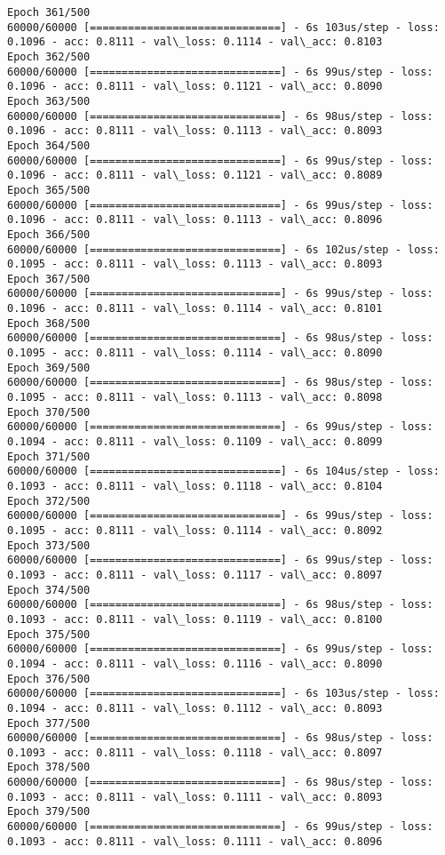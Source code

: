 \documentclass[11pt]{article}
\begin{document}
\begin{Verbatim}[commandchars=\\\{\}]
Epoch 361/500
60000/60000 [==============================] - 6s 103us/step - loss: 0.1096 - acc: 0.8111 - val\_loss: 0.1114 - val\_acc: 0.8103
Epoch 362/500
60000/60000 [==============================] - 6s 99us/step - loss: 0.1096 - acc: 0.8111 - val\_loss: 0.1121 - val\_acc: 0.8090
Epoch 363/500
60000/60000 [==============================] - 6s 98us/step - loss: 0.1096 - acc: 0.8111 - val\_loss: 0.1113 - val\_acc: 0.8093
Epoch 364/500
60000/60000 [==============================] - 6s 99us/step - loss: 0.1096 - acc: 0.8111 - val\_loss: 0.1121 - val\_acc: 0.8089
Epoch 365/500
60000/60000 [==============================] - 6s 99us/step - loss: 0.1096 - acc: 0.8111 - val\_loss: 0.1113 - val\_acc: 0.8096
Epoch 366/500
60000/60000 [==============================] - 6s 102us/step - loss: 0.1095 - acc: 0.8111 - val\_loss: 0.1113 - val\_acc: 0.8093
Epoch 367/500
60000/60000 [==============================] - 6s 99us/step - loss: 0.1096 - acc: 0.8111 - val\_loss: 0.1114 - val\_acc: 0.8101
Epoch 368/500
60000/60000 [==============================] - 6s 98us/step - loss: 0.1095 - acc: 0.8111 - val\_loss: 0.1114 - val\_acc: 0.8090
Epoch 369/500
60000/60000 [==============================] - 6s 98us/step - loss: 0.1095 - acc: 0.8111 - val\_loss: 0.1113 - val\_acc: 0.8098
Epoch 370/500
60000/60000 [==============================] - 6s 99us/step - loss: 0.1094 - acc: 0.8111 - val\_loss: 0.1109 - val\_acc: 0.8099
Epoch 371/500
60000/60000 [==============================] - 6s 104us/step - loss: 0.1093 - acc: 0.8111 - val\_loss: 0.1118 - val\_acc: 0.8104
Epoch 372/500
60000/60000 [==============================] - 6s 99us/step - loss: 0.1095 - acc: 0.8111 - val\_loss: 0.1114 - val\_acc: 0.8092
Epoch 373/500
60000/60000 [==============================] - 6s 99us/step - loss: 0.1093 - acc: 0.8111 - val\_loss: 0.1117 - val\_acc: 0.8097
Epoch 374/500
60000/60000 [==============================] - 6s 98us/step - loss: 0.1093 - acc: 0.8111 - val\_loss: 0.1119 - val\_acc: 0.8100
Epoch 375/500
60000/60000 [==============================] - 6s 99us/step - loss: 0.1094 - acc: 0.8111 - val\_loss: 0.1116 - val\_acc: 0.8090
Epoch 376/500
60000/60000 [==============================] - 6s 103us/step - loss: 0.1094 - acc: 0.8111 - val\_loss: 0.1112 - val\_acc: 0.8093
Epoch 377/500
60000/60000 [==============================] - 6s 98us/step - loss: 0.1093 - acc: 0.8111 - val\_loss: 0.1118 - val\_acc: 0.8097
Epoch 378/500
60000/60000 [==============================] - 6s 98us/step - loss: 0.1093 - acc: 0.8111 - val\_loss: 0.1111 - val\_acc: 0.8093
Epoch 379/500
60000/60000 [==============================] - 6s 99us/step - loss: 0.1093 - acc: 0.8111 - val\_loss: 0.1111 - val\_acc: 0.8096

\end{Verbatim}
\end{document}
